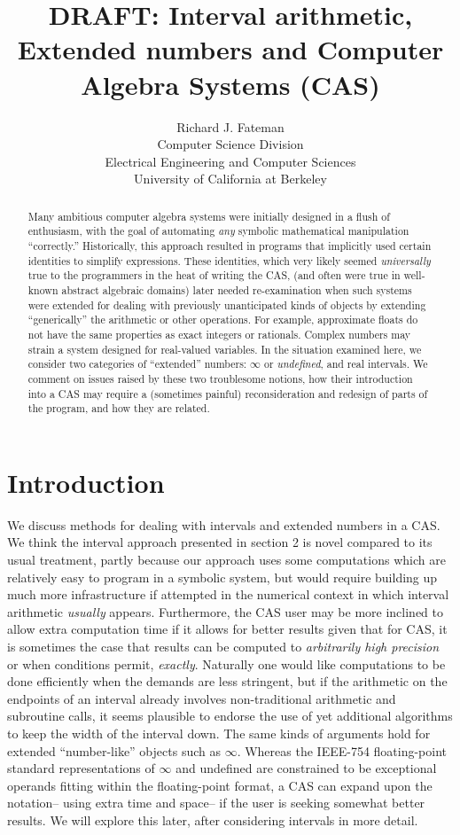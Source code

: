 \documentclass{article}
\title{DRAFT: Interval arithmetic, Extended numbers and Computer Algebra Systems (CAS)}
\author{Richard J. Fateman\\
Computer Science Division\\
Electrical Engineering and Computer Sciences\\
University of California at Berkeley }
\begin{document}
\maketitle
\begin{abstract}


Many ambitious computer algebra systems were initially designed in a
flush of enthusiasm, with the goal of automating {\em any} symbolic
mathematical manipulation ``correctly.'' Historically, this approach
resulted in programs that implicitly used certain identities to
simplify expressions. These identities, which very likely seemed {\em
universally} true to the programmers in the heat of writing the CAS,
(and often were true in well-known abstract algebraic domains) later
needed re-examination when such systems were extended for dealing with
previously unanticipated kinds of objects by extending ``generically''
the arithmetic or other operations.  For example, approximate floats
do not have the same properties as exact integers or rationals.
Complex numbers may strain a system designed for real-valued
variables.  In the situation examined here, we consider two categories
of ``extended'' numbers: $\infty$ or {\em undefined}, and real
intervals.  We comment on issues raised by these two troublesome
notions, how their introduction into a CAS may require a (sometimes
painful) reconsideration and redesign of parts of the program, and how
they are related.
\end{abstract}
\section {Introduction}

We discuss methods for dealing with intervals and extended numbers in
a CAS. We think the interval approach presented in section 2 is novel
compared to its usual treatment, partly because our approach uses some
computations which are relatively easy to program in a symbolic
system, but would require building up much more infrastructure if
attempted in the numerical context in which interval arithmetic {\em
usually} appears. Furthermore, the CAS user may be more inclined to
allow extra computation time if it allows for better results given
that for CAS, it is sometimes the case that results can be computed to
{\em arbitrarily high precision} or when conditions permit, {\em
exactly}. Naturally one would like computations to be done efficiently
when the demands are less stringent, but if the arithmetic on the
endpoints of an interval already involves non-traditional arithmetic
and subroutine calls, it seems plausible to endorse the use of yet
additional algorithms to keep the width of the interval down.  The
same kinds of arguments hold for extended ``number-like'' objects such
as $\infty$. 
Whereas the IEEE-754 floating-point standard representations of
$\infty$ and undefined are constrained to be exceptional operands
fitting within the floating-point format, a CAS can expand upon the
notation-- using extra time and space-- if the user is seeking
somewhat better results.  We will explore this later, after
considering intervals in more detail.
\end{document}
